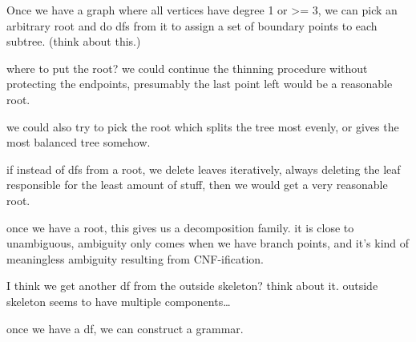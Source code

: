 \documentclass{book}
\begin{document}
\begin{itemize}
\begin{itemize}
      Once we have a graph where all vertices have degree 1 or >= 3,
      we can pick an arbitrary root and do dfs from it to assign a set
      of boundary points to each subtree. (think about this.)

      where to put the root? we could continue the thinning procedure
      without protecting the endpoints, presumably the last point left
      would be a reasonable root.

      we could also try to pick the root which splits the tree most
      evenly, or gives the most balanced tree somehow.

      if instead of dfs from a root, we delete leaves iteratively,
      always deleting the leaf responsible for the least amount of
      stuff, then we would get a very reasonable root.

      once we have a root, this gives us a decomposition family. it is
      close to unambiguous, ambiguity only comes when we have branch
      points, and it's kind of meaningless ambiguity resulting from
      CNF-ification.

      I think we get another df from the outside skeleton? think about
      it. outside skeleton seems to have multiple components\ldots{}
      
      once we have a df, we can construct a grammar.
\end{itemize}


\end{itemize}
\end{document}
